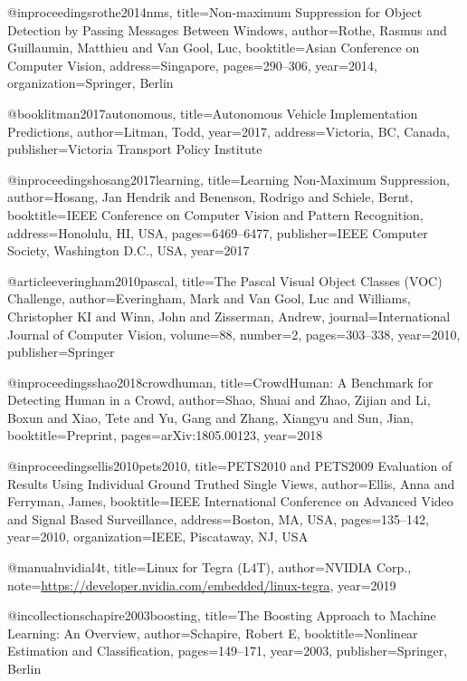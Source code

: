 @inproceedings{rothe2014nms,
  title={{{Non-maximum Suppression for Object Detection by Passing Messages Between Windows}}},
  author={Rothe, Rasmus and Guillaumin, Matthieu and Van Gool, Luc},
  booktitle={Asian Conference on Computer Vision},
  address={Singapore},
  pages={290--306},
  year={2014},
  organization={Springer, Berlin}
}

@book{litman2017autonomous,
  title={{{Autonomous Vehicle Implementation Predictions}}},
  author={Litman, Todd},
  year={2017},
  address={Victoria, BC, Canada},
  publisher={Victoria Transport Policy Institute}
}

@inproceedings{hosang2017learning,
  title={{{Learning Non-Maximum Suppression}}},
  author={Hosang, Jan Hendrik and Benenson, Rodrigo and Schiele, Bernt},
  booktitle={IEEE Conference on Computer Vision and Pattern Recognition},
  address={Honolulu, HI, USA},
  pages={6469--6477},
  publisher={IEEE Computer Society, Washington D.C., USA},
  year={2017}
}

@article{everingham2010pascal,
  title={{{The Pascal Visual Object Classes (VOC) Challenge}}},
  author={Everingham, Mark and Van Gool, Luc and Williams, Christopher KI and Winn, John and Zisserman, Andrew},
  journal={{International Journal of Computer Vision}},
  volume={88},
  number={2},
  pages={303--338},
  year={2010},
  publisher={Springer}
}

@inproceedings{shao2018crowdhuman,
  title={{{CrowdHuman: A Benchmark for Detecting Human in a Crowd}}},
  author={Shao, Shuai and Zhao, Zijian and Li, Boxun and Xiao, Tete and Yu, Gang and Zhang, Xiangyu and Sun, Jian},
  booktitle={Preprint},
  pages={arXiv:1805.00123},
  year={2018}
}

@inproceedings{ellis2010pets2010,
  title={{{PETS2010 and PETS2009 Evaluation of Results Using Individual Ground Truthed Single Views}}},
  author={Ellis, Anna and Ferryman, James},
  booktitle={IEEE International Conference on Advanced Video and Signal Based Surveillance},
  address={Boston, MA, USA},
  pages={135--142},
  year={2010},
  organization={IEEE, Piscataway, NJ, USA}
}

@manual{nvidial4t,
  title={{{Linux for Tegra (L4T)}}},
  author={{NVIDIA Corp.}},
  note={\url{https://developer.nvidia.com/embedded/linux-tegra}},
  year={2019}
}

@incollection{schapire2003boosting,
  title={{{The Boosting Approach to Machine Learning: An Overview}}},
  author={Schapire, Robert E},
  booktitle={{Nonlinear Estimation and Classification}},
  pages={149--171},
  year={2003},
  publisher={Springer, Berlin}
}


